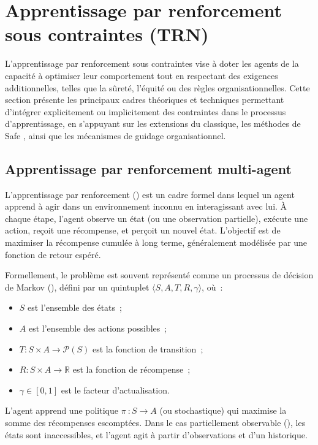 \section{Apprentissage par renforcement sous contraintes (TRN)}

L'apprentissage par renforcement sous contraintes vise à doter les agents de la capacité à optimiser leur comportement tout en respectant des exigences additionnelles, telles que la sûreté, l'équité ou des règles organisationnelles. Cette section présente les principaux cadres théoriques et techniques permettant d'intégrer explicitement ou implicitement des contraintes dans le processus d'apprentissage, en s'appuyant sur les extensions du  classique, les méthodes de Safe , ainsi que les mécanismes de guidage organisationnel.

\subsection{Apprentissage par renforcement multi-agent}

L'apprentissage par renforcement () est un cadre formel dans lequel un agent apprend à agir dans un environnement inconnu en interagissant avec lui. À chaque étape, l'agent observe un état (ou une observation partielle), exécute une action, reçoit une récompense, et perçoit un nouvel état. L'objectif est de maximiser la récompense cumulée à long terme, généralement modélisée par une fonction de retour espéré.

Formellement, le problème est souvent représenté comme un processus de décision de Markov (), défini par un quintuplet $\langle S, A, T, R, \gamma \rangle$, où~:
\begin{itemize}
    \item $S$ est l'ensemble des états~;
    \item $A$ est l'ensemble des actions possibles~;
    \item $T: S \times A \rightarrow \mathcal{P}(S)$ est la fonction de transition~;
    \item $R: S \times A \rightarrow \mathbb{R}$ est la fonction de récompense~;
    \item $\gamma \in [0,1]$ est le facteur d'actualisation.
\end{itemize}

L'agent apprend une politique $\pi~: S \rightarrow A$ (ou stochastique) qui maximise la somme des récompenses escomptées. Dans le cas partiellement observable (), les états sont inaccessibles, et l'agent agit à partir d'observations et d'un historique.


